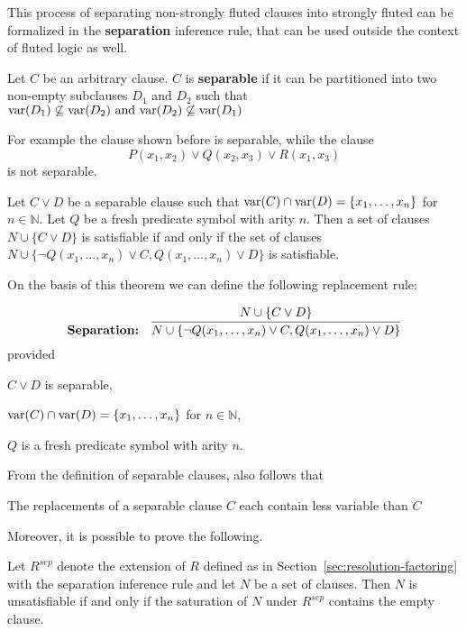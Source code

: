 This process of separating non-strongly fluted clauses into strongly fluted can be formalized in the \textbf{separation} inference rule, that can be used outside the context of fluted logic as well.

\begin{definition}
  Let \(C\) be an arbitrary clause. \(C\) is \textbf{separable} if it can be partitioned into two non-empty subclauses \(D_1\) and \(D_2\) such that \(\text{var} (D_1) \not\subseteq \text{var} (D_2) \text{ and } \text{var} (D_2) \not\subseteq \text{var} (D_1)\)
\end{definition}

For example the clause shown before is separable, while the clause
\[
P(x_1,x_2) \lor Q(x_2,x_3) \lor R(x_1,x_3)
\]
is not separable.
\begin{theorem}\label{thm:separation}
  Let \(C \lor D\) be a separable clause such that \(\text{var} (C) \cap \text{var} (D) = \{x_1,\ldots,x_n\}\) for \(n \in \mathbb{N}\).
  Let \(Q\) be a fresh predicate symbol with arity \(n\).
  Then a set of clauses \(N \cup \{C\lor D\}\) is satisfiable if and only if the set of clauses \(N \cup \{\neg Q(x_1,\ldots, x_n) \lor C, Q(x_1,\ldots, x_n) \lor D\}\) is satisfiable.
\end{theorem}

On the basis of this theorem we can define the following replacement rule:

\begin{equation}\label{eq:separation-rule}
  \textbf{Separation:} \quad \infer{N \cup \{\neg Q(x_1,\ldots, x_n) \lor C, Q(x_1,\ldots, x_n) \lor D\}}{N \cup \{C \lor D\}}
\end{equation}
\indent provided 
\begin{enumerate*}[label = (\roman*)]
  \item \(C \lor D\) is separable,
  \item \(\text{var} (C) \cap \text{var} (D) = \{x_1,\ldots,x_n\}\) for \(n \in \mathbb{N}\),
  \item \(Q\) is \indent a fresh predicate symbol with arity \(n\).
\end{enumerate*}

From the definition of separable clauses, also follows that
\begin{lemma}\label{lem:separation-replacement}
  The replacements of a separable clause \(C\) each contain less variable than \(C\)
\end{lemma}

Moreover, it is possible to prove the following.

\begin{theorem}
  Let \(R^{sep}\) denote the extension of \(R\) defined as in Section~\ref{sec:resolution-factoring} with the separation inference rule and let \(N\) be a set of clauses.
  Then \(N\) is unsatisfiable if and only if the saturation of \(N\) under \(R^{sep}\) contains the empty clause.
\end{theorem}

